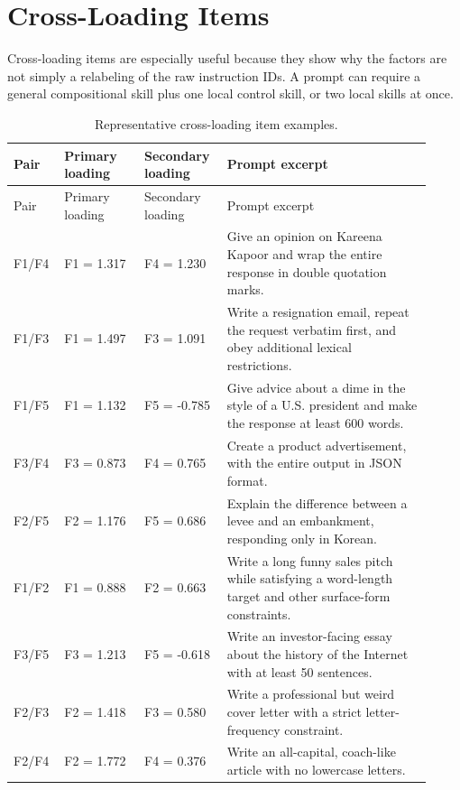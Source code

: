 \documentclass[11pt]{article}
\begin{document}
\section{Cross-Loading Items}

Cross-loading items are especially useful because they show why the factors are
not simply a relabeling of the raw instruction IDs.  A prompt can require a
general compositional skill plus one local control skill, or two local skills
at once.

\begin{longtable}{p{0.10\linewidth}p{0.18\linewidth}p{0.18\linewidth}p{0.46\linewidth}}
\caption{Representative cross-loading item examples.}\label{tab:cross}\\
\toprule
Pair & Primary loading & Secondary loading & Prompt excerpt \\
\midrule
\endfirsthead
\toprule
Pair & Primary loading & Secondary loading & Prompt excerpt \\
\midrule
\endhead
F1/F4 & F1 = 1.317 & F4 = 1.230 &
Give an opinion on Kareena Kapoor and wrap the entire response in double
quotation marks. \\
F1/F3 & F1 = 1.497 & F3 = 1.091 &
Write a resignation email, repeat the request verbatim first, and obey
additional lexical restrictions. \\
F1/F5 & F1 = 1.132 & F5 = -0.785 &
Give advice about a dime in the style of a U.S. president and make the response
at least 600 words. \\
F3/F4 & F3 = 0.873 & F4 = 0.765 &
Create a product advertisement, with the entire output in JSON format. \\
F2/F5 & F2 = 1.176 & F5 = 0.686 &
Explain the difference between a levee and an embankment, responding only in
Korean. \\
F1/F2 & F1 = 0.888 & F2 = 0.663 &
Write a long funny sales pitch while satisfying a word-length target and other
surface-form constraints. \\
F3/F5 & F3 = 1.213 & F5 = -0.618 &
Write an investor-facing essay about the history of the Internet with at least
50 sentences. \\
F2/F3 & F2 = 1.418 & F3 = 0.580 &
Write a professional but weird cover letter with a strict letter-frequency
constraint. \\
F2/F4 & F2 = 1.772 & F4 = 0.376 &
Write an all-capital, coach-like article with no lowercase letters. \\
\bottomrule
\end{longtable}
\end{document}
